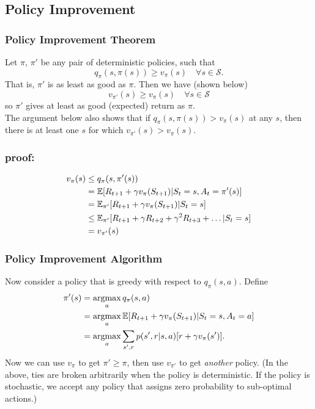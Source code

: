 \subsection{Policy Improvement}
\subsubsection*{Policy Improvement Theorem}

Let $\pi$, $\pi'$ be any pair of deterministic policies, such that
\begin{equation}
    q_\pi(s, \pi(s)) \geq v_\pi(s) \quad \forall s \in \mathcal{S}.
\end{equation}
That is, $\pi'$ is as least as good as $\pi$. Then we have (shown below)
\begin{equation}
    v_{\pi'}(s) \geq v_\pi(s) \quad \forall s \in \mathcal{S}
\end{equation}
so $\pi'$ gives at least as good (expected) return as $\pi$.\\

The argument below also shows that if $q_\pi(s, \pi(s)) > v_\pi(s)$ at any $s$, then there is at least one $s$ for which $v_{\pi'}(s) > v_\pi(s)$.
\subsubsection*{proof:}
\begin{align*}
    v_\pi(s) & \leq q_\pi(s, \pi'(s)) \\
             & = \mathbb{E}{}[R_{t+1} + \gamma v_\pi(S_{t+1}) | S_t=s, A_t=\pi'(s)] \\
             & = \mathbb{E}{}_{\pi'} [R_{t+1} + \gamma v_\pi(S_{t+1}) | S_t=s] \\
             & \leq \mathbb{E}{}_{\pi'} [R_{t+1} + \gamma R_{t+2} + \gamma^2 R_{t+3} + \dots| S_t=s] \\
             & = v_{\pi'}(s)
\end{align*}

\subsubsection*{Policy Improvement Algorithm}
Now consider a policy that is greedy with respect to $q_\pi(s, a)$. Define 
\begin{align}
    \pi'(s) &= \operatorname*{argmax}_a q_\pi(s, a) \\ 
            &= \operatorname*{argmax}_a \mathbb{E}{} [R_{t+1} + \gamma v_\pi(S_{t+1}) | S_t=s, A_t=a] \\
            &= \operatorname*{argmax}_a \sum_{s', r} p(s', r|s, a)[ r + \gamma v_\pi(s')].
\end{align}
Now we can use $v_\pi$ to get $\pi' \geq \pi$, then use $v_{\pi'}$ to get \emph{another} policy. (In the above, ties are broken arbitrarily when the policy is deterministic. If the policy is stochastic, we accept any policy that assigns zero probability to sub-optimal actions.)\\


